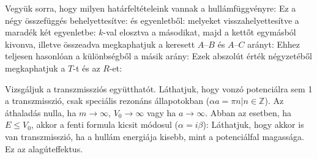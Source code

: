    Vegyük sorra, hogy milyen határfeltételeink vannak a hullámfüggvényre:
   Ez a négy összefüggés behelyettesítve:
    és  egyenletből: 
   melyeket visszahelyettesítve a maradék két egyenletbe:
   $k$-val elosztva a másodikat, majd a kettőt egymásból kivonva, illetve összeadva megkaphatjuk a keresett $A$--$B$ és $A$--$C$ arányt:
   Ehhez teljesen hasonlóan a különbségből a másik arány:
   Ezek abszolút érték négyzetéből megkaphatjuk a $T$-t és az $R$-et:
   
   Vizsgáljuk a transzmissziós együtthatót.
   Láthatjuk, hogy vonzó potenciálra sem 1 a transzmisszió, csak speciális rezonáns állapotokban ($\alpha a=\pi n|n\in\mathbb{Z}$).
   Az áthaladás nulla, ha $m\to\infty$, $V_0\to\infty$ vagy ha $a\to\infty$.
   Abban az esetben, ha $E\le V_0$, akkor a fenti formula kicsit módosul ($\alpha=i\beta$):
   Láthatjuk, hogy akkor is van transzmisszió, ha a hullám energiája kisebb, mint a potenciálfal magassága.
   Ez az alagúteffektus.

